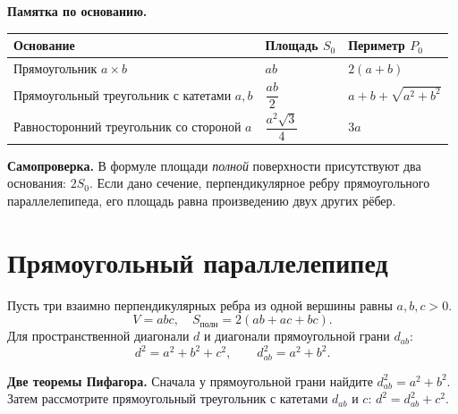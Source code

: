 \documentclass[a4paper,11pt]{article}
\newcommand{\key}[1]{{\color{darkaccent}\bfseries #1}}
\newcommand{\sect}[1]{\section{#1}\vspace{-4pt}}
\begin{document}
\begin{center}
\end{center}

\key{Памятка по основанию.}
\begin{center}
\renewcommand{\arraystretch}{1.3}
\begin{tabularx}{\linewidth}{@{}p{53mm}XX@{}}
\toprule
Основание & Площадь $S_0$ & Периметр $P_0$\\
\midrule
Прямоугольник $a\times b$ & $ab$ & $2(a+b)$\\
Прямоугольный треугольник с катетами $a,b$ & $\dfrac{ab}{2}$ & $a+b+\sqrt{a^2+b^2}$\\
Равносторонний треугольник со стороной $a$ & $\dfrac{a^2\sqrt3}{4}$ & $3a$\\
\bottomrule
\end{tabularx}
\end{center}

\key{Самопроверка.} В формуле площади \emph{полной} поверхности присутствуют два основания: $2S_0$. Если дано сечение, перпендикулярное ребру прямоугольного параллелепипеда, его площадь равна произведению двух других рёбер.

\clearpage
\sect{Прямоугольный параллелепипед}

Пусть три взаимно перпендикулярных ребра из одной вершины равны $a,b,c>0$.
\[
\boxed{V=abc},\quad
\boxed{S_{\text{полн}}=2(ab+ac+bc)}.
\]
Для пространственной диагонали $d$ и диагонали прямоугольной грани $d_{ab}$:
\[
\boxed{d^2=a^2+b^2+c^2},\qquad
\boxed{d_{ab}^2=a^2+b^2}.
\]

\key{Две теоремы Пифагора.} Сначала у прямоугольной грани найдите $d_{ab}^2=a^2+b^2$. Затем рассмотрите прямоугольный треугольник с катетами $d_{ab}$ и $c$: $d^2=d_{ab}^2+c^2$.
\end{document}
